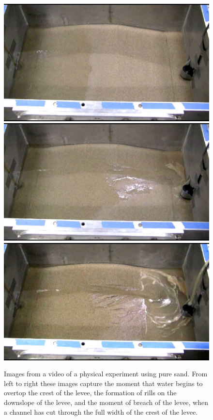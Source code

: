 \begin{figure}[t]
	\centering 
	\includegraphics[width=0.32\linewidth]{images/InitialOvertopping_flip.jpg}
	\includegraphics[width=0.32\linewidth]{images/ChannelsForm_flip.jpg}
	\includegraphics[width=0.32\linewidth]{images/BreachFormation_flip.jpg}
\caption[Images from laboratory experiment]{\label{figure:physical_experiment}Images from a video of a
  physical experiment using pure sand.  From left to right these
  images capture the moment that water begins to overtop the crest of
  the levee, the formation of rills on the downslope of the levee, and
  the moment of breach of the levee, when a channel has cut through
  the full width of the crest of the levee.}
\end{figure}

